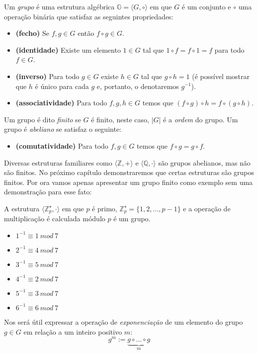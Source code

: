 Um {\em grupo} é uma estrutura algébrica $\mathbb{G} = \langle G, \circ \rangle$ em que $G$ é um conjunto e $\circ$ uma operação binária que satisfaz as seguintes propriedades:
\begin{itemize}
\item[] {\bf (fecho)} Se $f, g \in G$ então $f \circ g \in G$.
\item[] {\bf (identidade)} Existe um elemento $1 \in G$ tal que $1 \circ f = f \circ 1 = f$ para todo $f \in G$.
\item[] {\bf (inverso)} Para todo $g \in G$ existe $h \in G$ tal que $g \circ h = 1$ (é possível mostrar que $h$ é único para cada $g$ e, portanto, o denotaremos $g^{-1}$).
\item[] {\bf (associatividade)} Para todo $f,g,h \in G$ temos que $(f \circ g) \circ h = f \circ (g \circ h)$. 
\end{itemize}

Um grupo é dito {\em finito} se $G$ é finito, neste caso, $|G|$ é a {\em ordem} do grupo.
Um grupo é {\em abeliano} se satisfaz o seguinte:
\begin{itemize}
\item[] {\bf (comutatividade)} Para todo $f, g \in G$ temos que $f \circ g = g \circ f$.
\end{itemize}
 
Diversas estruturas familiares como $\langle \mathbb{Z}, + \rangle$ e $\langle \mathbb{Q}, \cdot \rangle$ são grupos abelianos, mas não são finitos.
No próximo capítulo demonstraremos que certas estruturas são grupos finitos.
Por ora vamos apenas apresentar um grupo finito como exemplo sem uma demonstração para esse fato:
\begin{example}
  A estrutura $\langle \mathbb{Z}_p^\star, \cdot \rangle$ em que $p$ é primo, $\mathbb{Z}_p^\star = \{1, 2, \dots, p - 1 \}$ e a operação de multiplicação é calculada módulo $p$ é um grupo.
\begin{itemize}
\item $1^{-1} \equiv 1\ mod\ 7$
\item $2^{-1} \equiv 4\ mod\ 7$
\item $3^{-1} \equiv 5\ mod\ 7$
\item $4^{-1} \equiv 2\ mod\ 7$
\item $5^{-1} \equiv 3\ mod\ 7$
\item $6^{-1} \equiv 6\ mod\ 7$
\end{itemize}
\end{example}

Nos será útil expressar a operação de {\em exponenciação} de um elemento do grupo $g \in G$ em relação a um inteiro positivo $m$:
\begin{displaymath}
  g^m := \underbrace{g \circ \dots \circ g}_m
\end{displaymath}


